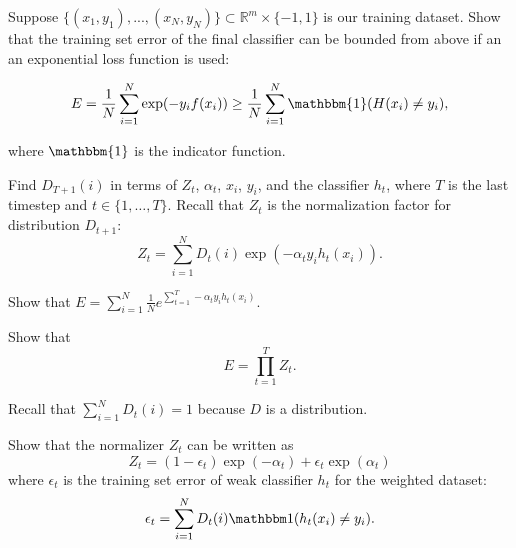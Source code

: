 Suppose $\{(x_1, y_1), ..., (x_N, y_N)\} \subset \mathbb{R}^m \times \{-1,1\}$ is our training dataset.  Show that the training set error of the final classifier can be bounded from
above if an an exponential loss function is used:

$$E = \frac{1}{N} \sum\limits_{i=1}^N \exp(-y_{i}f(x_i)) \geq \frac{1}{N} \sum\limits_{i=1}^N \mathbbm{1}(H(x_i) \neq y_i),$$

where $\mathbbm{1}$ is the indicator function.

\begin{solution}

\end{solution}

\problem[3]
Find $D_{T + 1}(i)$ in terms of $Z_t$, $\alpha_t$, $x_i$, $y_i$, and the classifier $h_t$, where $T$ is the last timestep and $t \in \{1, \ldots, T\}$. Recall that $Z_t$ is the normalization factor for distribution $D_{t+1}$:
$$Z_t = \sum\limits_{i=1}^N D_t(i) \exp(-\alpha_{t}y_{i}h_{t}(x_{i})).$$

\begin{solution}

\end{solution}

\problem[2]
Show that $E = \sum_{i=1}^N  \frac{1}{N} e^{\sum_{t=1}^T -\alpha_t y_i h_t(x_i)}.$

\begin{solution}

\end{solution}

\problem[5]
Show that
$$E = \prod\limits_{t=1}^T Z_t.$$

\begin{hint}
	Recall that $\sum_{i = 1}^N D_t(i) = 1$ because $D$ is a distribution.
\end{hint}

\begin{solution}

\end{solution}

\problem[5]
Show that the normalizer $Z_t$ can be written as
\[Z_t = (1 - \epsilon_t) \exp(-\alpha_t) + \epsilon_{t} \exp(\alpha_t)\]
where $\epsilon_t$ is the training set error of weak classifier $h_t$ for the weighted dataset:
\[\epsilon_t = \sum\limits_{i=1}^N D_t(i)\mathbbm1(h_t(x_i) \neq y_i).\]

\begin{solution}
	
\end{solution}

